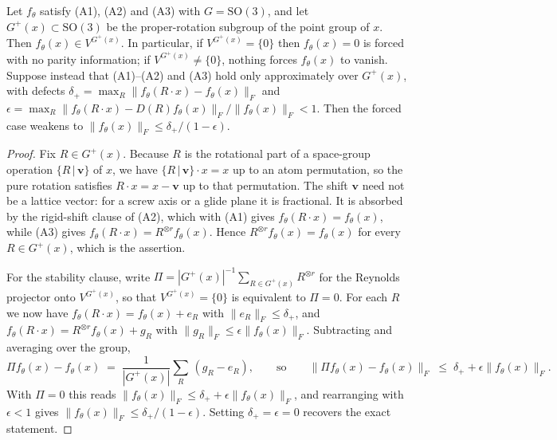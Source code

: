 \begin{corollary}\label{scor:rot}
Let $f_\theta$ satisfy (A1), (A2) and (A3) with $G = \mathrm{SO}(3)$, and let $G^{+}(x) \subset \mathrm{SO}(3)$ be the proper-rotation subgroup of the point group of $x$. Then $f_\theta(x) \in V^{G^{+}(x)}$. In particular, if $V^{G^{+}(x)} = \{0\}$ then $f_\theta(x) = 0$ is forced with no parity information; if $V^{G^{+}(x)} \neq \{0\}$, nothing forces $f_\theta(x)$ to vanish. Suppose instead that (A1)--(A2) and (A3) hold only approximately over $G^{+}(x)$, with defects $\delta_{+} = \max_{R} \lVert f_\theta(R\!\cdot\!x) - f_\theta(x)\rVert_F$ and $\epsilon = \max_{R} \lVert f_\theta(R\!\cdot\!x) - D(R)f_\theta(x)\rVert_F / \lVert f_\theta(x)\rVert_F < 1$. Then the forced case weakens to $\lVert f_\theta(x)\rVert_F \le \delta_{+}/(1-\epsilon)$.
\end{corollary}

\begin{proof}
Fix $R \in G^{+}(x)$. Because $R$ is the rotational part of a space-group operation $\{R \,|\, \mathbf{v}\}$ of $x$, we have $\{R \,|\, \mathbf{v}\}\!\cdot\!x = x$ up to an atom permutation, so the pure rotation satisfies $R\!\cdot\!x = x - \mathbf{v}$ up to that permutation. The shift $\mathbf{v}$ need not be a lattice vector: for a screw axis or a glide plane it is fractional. It is absorbed by the rigid-shift clause of (A2), which with (A1) gives $f_\theta(R\!\cdot\!x) = f_\theta(x)$, while (A3) gives $f_\theta(R\!\cdot\!x) = R^{\otimes r} f_\theta(x)$. Hence $R^{\otimes r} f_\theta(x) = f_\theta(x)$ for every $R \in G^{+}(x)$, which is the assertion.

For the stability clause, write $\Pi = |G^{+}(x)|^{-1}\sum_{R \in G^{+}(x)} R^{\otimes r}$ for the Reynolds projector onto $V^{G^{+}(x)}$, so that $V^{G^{+}(x)} = \{0\}$ is equivalent to $\Pi = 0$. For each $R$ we now have $f_\theta(R\!\cdot\!x) = f_\theta(x) + e_R$ with $\lVert e_R\rVert_F \le \delta_{+}$, and $f_\theta(R\!\cdot\!x) = R^{\otimes r}f_\theta(x) + g_R$ with $\lVert g_R\rVert_F \le \epsilon\lVert f_\theta(x)\rVert_F$. Subtracting and averaging over the group,
\[
\Pi f_\theta(x) - f_\theta(x) \;=\; \frac{1}{|G^{+}(x)|}\sum_{R}\,(g_R - e_R),
\qquad\text{so}\qquad
\lVert \Pi f_\theta(x) - f_\theta(x)\rVert_F \;\le\; \delta_{+} + \epsilon\lVert f_\theta(x)\rVert_F .
\]
With $\Pi = 0$ this reads $\lVert f_\theta(x)\rVert_F \le \delta_{+} + \epsilon \lVert f_\theta(x)\rVert_F$, and rearranging with $\epsilon<1$ gives $\lVert f_\theta(x)\rVert_F \le \delta_{+}/(1-\epsilon)$. Setting $\delta_{+} = \epsilon = 0$ recovers the exact statement.
\end{proof}

